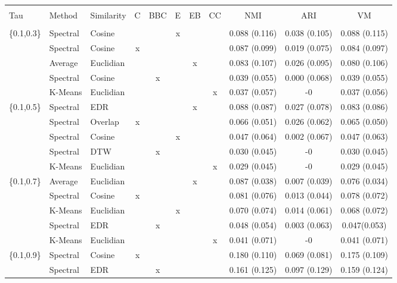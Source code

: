 \documentclass[12pt,a4paper,bibliography=totocnumbered,listof=totocnumbered]{scrartcl}
\begin{document}
\begin{appendix}
\begin{table}[!htbp] \centering 
	\label{} 
	\scriptsize
	\begin{tabularx}{\textwidth}{ lllcccccccc} \\
		\\[-1.8ex]	\toprule
		\\[-1.8ex] 
Tau & Method & Similarity & C & BBC & E & EB & CC & NMI & ARI & VM \\ 
\hline \\[-1.8ex] 
\{0.1,0.3\} & Spectral & Cosine &  &  & x &  &  & 0.088 (0.116) & 0.038 (0.105) & 0.088 (0.115) \\ 
& Spectral & Cosine & x &  &  &  &  & 0.087 (0.099) & 0.019 (0.075) & 0.084 (0.097) \\ 
& Average & Euclidian &  &  &  & x &  & 0.083 (0.107) & 0.026 (0.095) & 0.080 (0.106) \\ 
& Spectral & Cosine &  & x &  &  &  & 0.039 (0.055) & 0.000 (0.068) & 0.039 (0.055) \\ 
& K-Means & Euclidian &  &  &  &  & x & 0.037 (0.057) & -0 & 0.037 (0.056) \\ 
\{0.1,0.5\} & Spectral & EDR &  &  &  & x &  & 0.088 (0.087) & 0.027 (0.078) & 0.083 (0.086) \\ 
& Spectral & Overlap & x &  &  &  &  & 0.066 (0.051) & 0.026 (0.062) & 0.065 (0.050) \\ 
& Spectral & Cosine &  &  & x &  &  & 0.047 (0.064) & 0.002 (0.067) & 0.047 (0.063) \\ 
& Spectral & DTW &  & x &  &  &  & 0.030 (0.045) & -0 & 0.030 (0.045) \\ 
& K-Means & Euclidian &  &  &  &  & x & 0.029 (0.045) & -0 & 0.029 (0.045) \\ 
\{0.1,0.7\} & Average & Euclidian &  &  &  & x &  & 0.087 (0.038) & 0.007 (0.039) & 0.076 (0.034) \\ 
& Spectral & Cosine & x &  &  &  &  & 0.081 (0.076) & 0.013 (0.044) & 0.078 (0.072) \\ 
& K-Means & Euclidian &  &  & x &  &  & 0.070 (0.074) & 0.014 (0.061) & 0.068 (0.072) \\ 
& Spectral & EDR &  & x &  &  &  & 0.048 (0.054) & 0.003 (0.063) & 0.047(0.053) \\ 
& K-Means & Euclidian &  &  &  &  & x & 0.041 (0.071) & -0 & 0.041 (0.071) \\ 
\{0.1,0.9\} & Spectral & Cosine & x &  &  &  &  & 0.180 (0.110) & 0.069 (0.081) & 0.175 (0.109) \\ 
& Spectral & EDR &  & x &  &  &  & 0.161 (0.125) & 0.097 (0.129) & 0.159 (0.124) \\ 

\end{tabularx}
\end{table}
\end{appendix}
\end{document}
